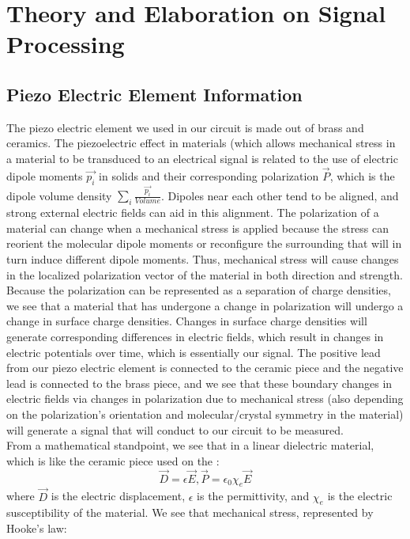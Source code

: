 \documentclass{article}
\begin{document}
\section{Theory and Elaboration on Signal Processing}
    \subsection{Piezo Electric Element Information}
    The piezo electric element we used in our circuit is made out of brass and ceramics. The piezoelectric effect in materials (which allows mechanical stress in a material to be transduced to an electrical signal is related to the use of electric dipole moments $\vec{p_i}$ in solids and their corresponding polarization $\vec{P}$, which is the dipole volume density $\sum_i{\frac{\vec{p_i}}{Volume}}$. Dipoles near each other tend to be aligned, and strong external electric fields can aid in this alignment. The polarization of a material can change when a mechanical stress is applied because the stress can reorient the molecular dipole moments or reconfigure the surrounding that will in turn induce different dipole moments. Thus, mechanical stress will cause changes in the localized polarization vector of the material in both direction and strength. Because the polarization can be represented as a separation of charge densities, we see that a material that has undergone a change in polarization will undergo a change in surface charge densities. Changes in surface charge densities will generate corresponding differences in electric fields, which result in changes in electric potentials over time, which is essentially our signal. The positive lead from our piezo electric element is connected to the ceramic piece and the negative lead is connected to the brass piece, and we see that these boundary changes in electric fields via changes in polarization due to mechanical stress (also depending on the polarization's orientation and molecular/crystal symmetry in the material) will generate a signal that will conduct to our circuit to be measured.\\ From a mathematical standpoint, we see that in a linear dielectric material, which is like the ceramic piece used on the :
    \begin{equation}
        \vec{D} = \epsilon \vec{E}, \vec{P} = \epsilon_0 \chi_e \vec{E}
    \end{equation}
    where $\vec{D}$ is the electric displacement, $\epsilon$ is the permittivity, and $\chi_e$ is the electric susceptibility of the material. We see that mechanical stress, represented by Hooke's law:
\end{document}

